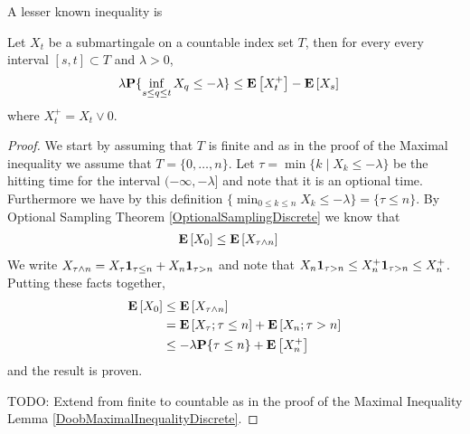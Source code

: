 A lesser known inequality is
\begin{lem}\label{DoobMinimalInequalityDiscrete}Let $X_t$ be a
  submartingale on a countable index set $T$, then for every every
  interval $[s,t] \subset T$ and $\lambda > 0$, 
\begin{align*}
\lambda \textbf{P}\{\inf_{s \leq q \leq t} X_q \leq -\lambda\} &\leq
\textbf{E}\left[X_t^+\right] - \textbf{E}\left[X_s\right]
\end{align*}
where $X_t^+ = X_t \vee 0$.
\end{lem}
\begin{proof}
We start by assuming that $T$ is finite and as in the proof of the
Maximal inequality we assume that $T = \lbrace 0, \dots, n \rbrace$.
Let $\tau = \min \lbrace k \mid X_k \leq -\lambda \rbrace$ be the
hitting time for the interval $(-\infty, -\lambda]$ and note that it
is an optional time.  Furthermore we have by this definition $\lbrace \min_{0
  \leq k \leq n} X_k \leq -\lambda \rbrace=\lbrace \tau \leq n\rbrace$.  By
Optional Sampling Theorem \ref{OptionalSamplingDiscrete} we know that 
\begin{align*}
\textbf{E}\left[X_0\right] &\leq \textbf{E}\left[X_{\tau \wedge n}\right]
\end{align*}
We write $X_{\tau \wedge n} = X_\tau \textbf{1}_{\tau \leq n}
+ X_n \textbf{1}_{\tau > n}$ and note that $ X_n \textbf{1}_{\tau
  > n} \leq  X_n^+ \textbf{1}_{\tau > n} \leq X_n^+$.  Putting
these facts together,
\begin{align*}
\textbf{E}\left[X_0\right] &\leq \textbf{E}\left[X_{\tau \wedge n}\right] \\
&=\textbf{E}\left[X_{\tau} ; \tau \leq n\right] + \textbf{E}\left[X_n ; \tau > n\right]
\\
&\leq -\lambda \textbf{P}\{\tau \leq n\} + \textbf{E}\left[X_n^+\right] 
\end{align*}
and the result is proven.

TODO: Extend from finite to countable as in the proof of the Maximal
Inequality Lemma \ref{DoobMaximalInequalityDiscrete}.
\end{proof}
 
